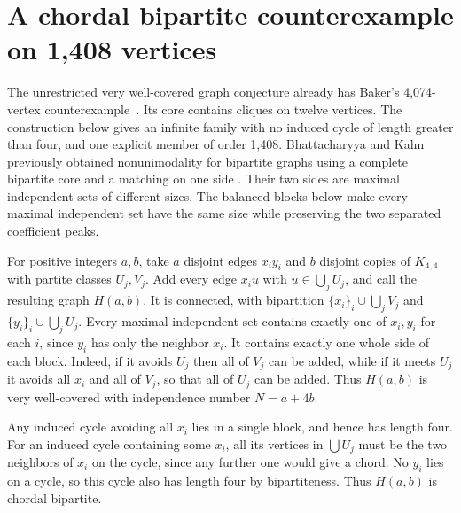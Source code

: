 \documentclass[11pt,a4paper]{article}
\theoremstyle{remark}\newtheorem{remark}[theorem]{Remark}
\numberwithin{equation}{section}
\begin{document}
\section{A chordal bipartite counterexample on 1,408 vertices}
\label{sec:bipartite-valley}
The unrestricted very well-covered graph conjecture already has Baker's
4,074-vertex counterexample~\cite{Baker}. Its core contains cliques on twelve vertices.
The construction below gives an infinite family with no induced cycle of
length greater than four, and one explicit member of order 1,408.
Bhattacharyya and Kahn previously obtained nonunimodality for bipartite
graphs using a complete bipartite core and a matching on one side
\cite{BK}. Their two sides are maximal
independent sets of different sizes. The balanced blocks below make
every maximal independent set have the same size while preserving the
two separated coefficient peaks.

For positive integers $a,b$, take $a$ disjoint edges $x_i y_i$ and $b$
disjoint copies of $K_{4,4}$ with partite classes $U_j,V_j$. Add every
edge $x_i u$ with $u\in\bigcup_j U_j$, and call the resulting graph
$H(a,b)$. It is connected, with bipartition
$\{x_i\}_i\cup\bigcup_j V_j$ and $\{y_i\}_i\cup\bigcup_j U_j$.
Every maximal independent set contains exactly one of $x_i,y_i$ for each
$i$, since $y_i$ has only the neighbor $x_i$. It contains exactly one
whole side of each block. Indeed, if it avoids $U_j$ then all of $V_j$
can be added, while if it meets $U_j$ it avoids all $x_i$ and all of
$V_j$, so that all of $U_j$ can be added. Thus $H(a,b)$ is very
well-covered with independence number $N=a+4b$.

Any induced cycle avoiding all $x_i$ lies in a single block, and hence
has length four. For an induced cycle containing some $x_i$, all its
vertices in $\bigcup U_j$ must be the two neighbors of $x_i$ on the cycle,
since any further one would give a chord. No $y_i$ lies on a cycle,
so this cycle also has length four by bipartiteness. Thus $H(a,b)$ is
chordal bipartite.
\end{document}

